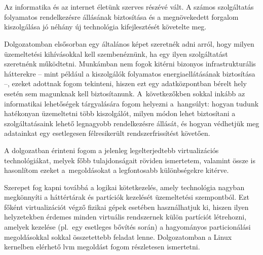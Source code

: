 \chapter{\bevezetes}

%

Az informatika és az internet életünk szerves részévé vált. A számos szolgáltatás folyamatos rendelkezésre állásának biztosítása és a megnövekedett forgalom kiszolgálása jó néhány új technológia kifejlesztését követelte meg.

Dolgozatomban elsősorban egy általános képet szeretnék adni arról, hogy milyen üzemeltetési kihívásokkal kell szembenéznünk, ha egy ilyen szolgáltatást szeretnénk működtetni. Munkámban nem fogok kitérni bizonyos infrastrukturális hátterekre -- mint például a kiszolgálók folyamatos energiaellátásának biztosítása --, ezeket adottnak fogom tekinteni, hiszen ezt egy adatközpontban bérelt hely esetén sem magunknak kell biztosítanunk. A~következőkben sokkal inkább az informatikai lehetőségek tárgyalására fogom helyezni a~hangsúlyt: hogyan tudunk hatékonyan üzemeltetni több kiszolgálót, milyen módon lehet biztosítani a szolgáltatásaink lehető legnagyobb rendelkezésre állását, és hogyan védhetjük meg adatainkat egy esetlegesen félresikerült rendszerfrissítést követően.

A dolgozatban érinteni fogom a jelenleg legelterjedtebb virtualizációs technológiákat, melyek főbb tulajdonságait röviden ismertetem, valamint össze is hasonlítom ezeket a~megoldásokat a legfontosabb különbségekre kitérve.

Szerepet fog kapni továbbá a logikai kötetkezelés, amely technológia nagyban megkönnyíti a háttértárak és partíciók kezelését üzemeltetési szempontból. Ezt főként virtualizációt végző fizikai gépek esetében használhatjuk ki, hiszen ilyen helyzetekben érdemes minden virtuális rendszernek külön partíciót létrehozni, amelyek kezelése (pl.~egy esetleges bővítés során) a hagyományos particionálási megoldásokkal sokkal összetettebb feladat lenne. Dolgozatomban a Linux kernelben elérhető \acrfull{lvm} megoldást fogom részletesen ismertetni. 

